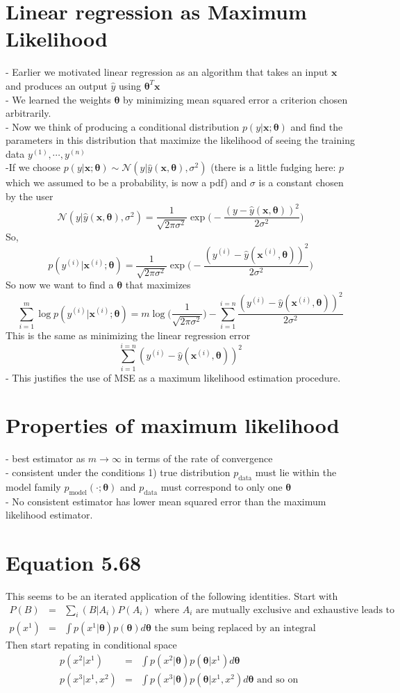 \documentclass{article}
\newcommand{\beq}{\begin{equation}}
\newcommand{\eeq}{\end{equation}}
\newcommand{\ber}{\begin{eqnarray}}
\newcommand{\eer}{\end{eqnarray}}
\begin{document}
\section{Linear regression as Maximum Likelihood}
- Earlier we motivated linear regression as an algorithm that takes an input $\pmb{x}$ and produces an output $\hat{y}$ using ${\pmb{\theta}}^T\pmb{x}$\\
- We learned the weights $\pmb{\theta}$ by minimizing mean squared error a criterion chosen arbitrarily.\\
- Now we think of producing a conditional distribution $p(y|\pmb{x};\pmb{\theta})$ and find the parameters in this distribution that maximize the likelihood of seeing the training data $y^{(1)},\cdots,y^{(n)}$\\
-If we choose $p(y|\pmb{x};\pmb{\theta}) \sim \mathcal{N}(y|\hat{y}(\pmb{x},\pmb{\theta}),\sigma^2)$ (there is a little fudging here: $p$ which we assumed to be a probability, is now a pdf) and $\sigma$ is a constant chosen by the user\\
\beq
\mathcal{N}(y|\hat{y}(\pmb{x},\pmb{\theta}),\sigma^2) = \frac{1}{\sqrt{2\pi\sigma^2}}\exp\Big(-\frac{(y-\hat{y}(\pmb{x},\pmb{\theta}))^2}{2\sigma^2}\Big) 
\eeq
So,
\beq
p(y^{(i)}|\pmb{x}^{(i)};\pmb{\theta}) = \frac{1}{\sqrt{2\pi\sigma^2}}\exp\Big(-\frac{(y^{(i)}-\hat{y}(\pmb{x}^{(i)},\pmb{\theta}))^2}{2\sigma^2}\Big) 
\eeq
So now we want to find a $\pmb{\theta}$ that maximizes
\beq
\sum_{i=1}^{m}\log{}p(y^{(i)}|\pmb{x}^{(i)};\pmb{\theta}) = m\log\Big(\frac{1}{\sqrt{2\pi\sigma^2}}\Big) - \sum_{i=1}^{i=n}\frac{(y^{(i)}-\hat{y}(\pmb{x}^{(i)},\pmb{\theta}))^2}{2\sigma^2}
\eeq
This is the same as minimizing the linear regression error
\beq
\sum_{i=1}^{i=n}(y^{(i)}-\hat{y}(\pmb{x}^{(i)},\pmb{\theta}))^2
\eeq
- This justifies the use of MSE as a maximum likelihood estimation procedure.
\section{Properties of maximum likelihood}
- best estimator as $m\rightarrow\infty$ in terms of the rate of convergence\\
- consistent under the conditions 1) true distribution $p_{\text{data}}$ must lie within the model family $p_{\text{model}}(\cdot;\pmb{\theta})$ and $p_{\text{data}}$ must correspond to only one $\pmb{\theta}$\\
- No consistent estimator has lower mean squared error than the maximum likelihood estimator.
\section{Equation 5.68}
This seems to be an iterated application of the following identities.
Start with
\ber
P(B)  &=& \sum_i(B|A_i)P(A_i) \text{ where $A_i$ are mutually exclusive and exhaustive leads to }\\
p(x^1)&=&\int p(x^1|\pmb{\theta})p(\pmb{\theta})d\pmb{\theta}  \text{ the sum being replaced by an integral }
\eer
Then start repating in conditional space
\ber
p(x^2|x^1)&=&\int p(x^2|\pmb{\theta})p(\pmb{\theta}|x^1)d\pmb{\theta} \\
p(x^3|x^1,x^2)&=&\int p(x^3|\pmb{\theta})p(\pmb{\theta}|x^1,x^2)d\pmb{\theta} \text{ and so on }
\eer
\end{document}
